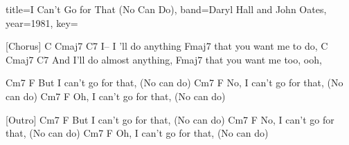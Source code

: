 \documentclass{skrul-leadsheet}
\begin{document}
\begin{song}[transpose-capo=true]{title={I Can't Go for That (No Can Do)}, band={Daryl Hall and John Oates}, year={1981}, key={}}
 
[Chorus]
C  Cmaj7        C7
I-- I 'll do anything
                 Fmaj7
that you want me to do,
    C  Cmaj7          C7
And I'll do almost anything,
                 Fmaj7
that you want me too, ooh,
 
    Cm7                   F
But I can't go for that, (No can do)
    Cm7                   F
No, I can't go for that, (No can do)
    Cm7                   F
Oh, I can't go for that, (No can do)
 
 
[Outro]
    Cm7                   F
But I can't go for that, (No can do)
    Cm7                   F
No, I can't go for that, (No can do)
    Cm7                   F
Oh, I can't go for that, (No can do)


\end{song}
\end{document}
